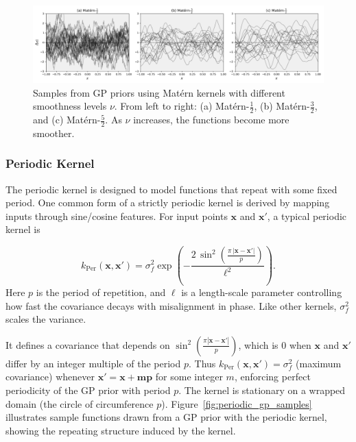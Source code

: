 \documentclass{ut-thesis}
\begin{document}
\begin{figure}[htbp]
    \centering
    \includegraphics[width=\textwidth]{Matern.png}
    \caption[Gaussian Process samples with Matérn kernels]{
        Samples from GP priors using Matérn kernels with different smoothness levels \( \nu \).
        From left to right: (a) Matérn-\( \frac{1}{2} \), (b) Matérn-\( \frac{3}{2} \), and (c) Matérn-\( \frac{5}{2} \).
        As \( \nu \) increases, the functions become more smoother.
    }
    \label{fig:matern_gp_samples}
\end{figure}

\newpage
\subsubsection{Periodic Kernel}

The periodic kernel is designed to model functions that repeat with some fixed period\cite{mackay1998introduction}. One common form of a strictly periodic kernel is derived by mapping inputs through sine/cosine features. For input points $\mathbf{x}$ and $\mathbf{x'}$, a typical periodic kernel is

\begin{equation}
k_{\mathrm{Per}}(\mathbf{x}, \mathbf{x'})
= \sigma_f^2
\exp\!\left(
- \frac{2\,\sin^2\!\left(\tfrac{\pi\,\lvert \mathbf{x} - \mathbf{x'}\rvert}{p}\right)}{\ell^2}
\right).
\end{equation}
Here $p$ is the period of repetition, and $\ell$ is a length-scale parameter controlling how fast the covariance decays with misalignment in phase. Like other kernels, $\sigma_f^2$ scales the variance.

It defines a covariance that depends on $\sin^2(\frac{\pi|\mathbf{x}-\mathbf{x'}|}{p})$, which is $0$ when $\mathbf{x}$ and $\mathbf{x'}$ differ by an integer multiple of the period $p$. Thus $k_{\text{Per}}(\mathbf{x},\mathbf{x'}) = \sigma_f^2$ (maximum covariance) whenever $\mathbf{x'} = \mathbf{x} + \mathbf{mp}$ for some integer $m$, enforcing perfect periodicity of the GP prior with period $p$. The kernel is stationary on a wrapped domain (the circle of circumference $p$). Figure~\ref{fig:periodic_gp_samples} illustrates sample functions drawn from a GP prior with the periodic kernel, showing the repeating structure induced by the kernel.
\end{document}
